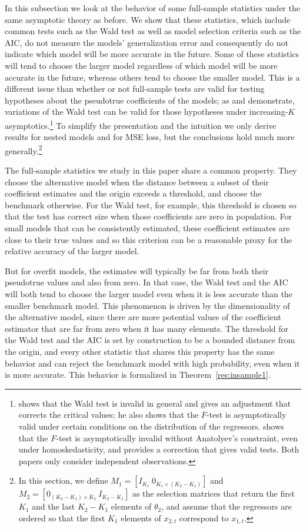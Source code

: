 In this subsection we look at the behavior of some full-sample
statistics under the same asymptotic theory as before.  We show that
these statistics, which include common tests such as the Wald test as
well as model selection criteria such as the AIC, do not measure the
models' generalization error and consequently do not indicate which
model will be more accurate in the future. Some of these statistics
will tend to choose the larger model regardless of which model will be
more accurate in the future, whereas others tend to choose the smaller
model.  This is a different issue than whether or not full-sample
tests are valid for testing hypotheses about the pseudotrue
coefficients of the models; as \citet{Cal:11c} and \citet{Ana:12}
demonstrate, variations of the Wald test can be valid for those
hypotheses under increasing-$K$ asymptotics.\footnote{%
  \citet{Ana:12} shows that the Wald test is invalid in general and
  gives an adjustment that corrects the critical values; he also shows
  that the $F$-test is asymptotically valid under certain conditions
  on the distribution of the regressors.  \citet{Cal:11c} shows that
  the $F$-test is asymptotically invalid without Anatolyev's
  constraint, even under homoskedasticity, and provides a correction
  that gives valid tests.  Both papers only consider independent
  observations.} %
To simplify the presentation and the intuition we only derive results
for nested models and for MSE loss, but the conclusions hold much more
generally.\footnote{%
  In this section, we define
  $M_1 = [I_{K_1} \ 0_{K_1 \times (K_2 - K_1)}]$ and
  $M_2 = [0_{(K_2 - K_1) \times K_2} \ I_{K_2 - K_1}]$ as the
  selection matrices that return the first $K_1$ and the last
  $K_2 - K_1$ elements of $\theta_2$, and assume that the regressors
  are ordered so that the first $K_1$ elements of $x_{2,t}$ correspond
  to $x_{1,t}$.} %

The full-sample statistics we study in this paper share a common
property. They choose the alternative model when the distance between
a subset of their coefficient estimates and the origin exceeds a
threshold, and choose the benchmark otherwise. For the Wald test, for
example, this threshold is chosen so that the test has correct size
when those coefficients are zero in population. For small models that
can be consistently estimated, these coefficient estimates are close
to their true values and so this criterion can be a reasonable proxy
for the relative accuracy of the larger model.

But for overfit models, the estimates will typically be far from both
their pseudotrue values and also from zero. In that case, the Wald test and
the AIC will both tend to choose the larger model even when it is less
accurate than the smaller benchmark model. This phenomenon is driven
by the dimensionality of the alternative model, since there are more
potential values of the coefficient estimator that are far from zero
when it has many elements. The threshold for the Wald test and the AIC
is set by construction to be a bounded distance from the origin, and
every other statistic that shares this property has the same behavior
and can reject the benchmark model with high probability, even when
it is more accurate. This behavior is
formalized in Theorem~\ref{res:insample1}.

